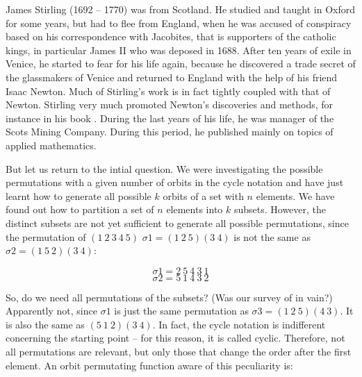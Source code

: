 \documentclass{scrreprt}
\begin{document}
James Stirling (1692 -- 1770) was from Scotland.
He studied and taught in Oxford for some years, but had to
flee from England, when he was accused of conspiracy
based on his correspondence with Jacobites, 
that is supporters of the catholic kings, 
in particular James II who was deposed in 1688.
After ten years of exile in Venice,
he started to fear for his life again, because
he discovered a trade secret of the glassmakers of Venice
and returned to England with the help of his friend
Isaac Newton. Much of Stirling's work
is in fact tightly coupled with that of Newton.
Stirling very much promoted Newton's discoveries and methods,
for instance
in his book .
During the last years of his life,
he was manager of the Scots Mining Company.
During this period, he published mainly on topics
of applied mathematics.

But let us return to the intial question.
We were investigating the possible permutations
with a given number of orbits in the cycle notation
and have just learnt how to generate all possible $k$ orbits
of a set with $n$ elements.
We have found out how to partition 
a set of $n$ elements into $k$ subsets.
However, the distinct subsets are not yet sufficient
to generate all possible permutations,
since the permutation of $(1~2~3~4~5)$
$\sigma1 = (1~2~5) (3~4)$
is not the same as $\sigma2 = (1~5~2) (3~4)$:

\[
\sigma1 = 2~5~4~3~1
\]
\[
\sigma2 = 5~1~4~3~2
\]

So, do we need all permutations of the subsets?
(Was our survey of  in vain?)
Apparently not, since $\sigma1$ is just the same
permutation as $\sigma3 = (1~2~5) (4~3)$.
It is also the same as $(5~1~2) (3~4)$.
In fact, the cycle notation is indifferent
concerning the starting point -- for this reason, it is called cyclic.
Therefore, not all permutations are relevant,
but only those that change the order after the first element.
An orbit permutating function aware of this peculiarity is:
\end{document}
